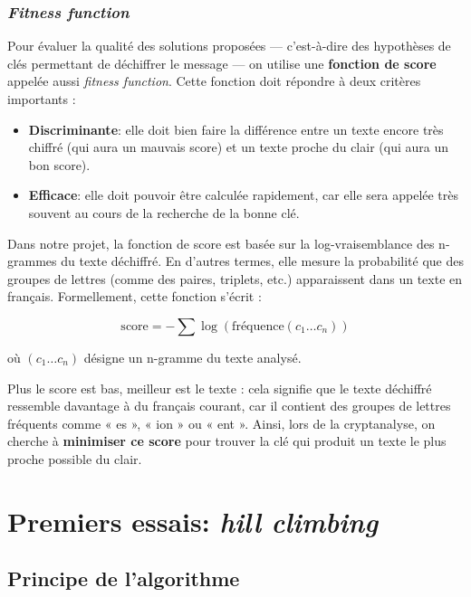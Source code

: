 \documentclass[a4paper]{article}
\begin{document}
\subsubsection{\textit{Fitness function}}

Pour évaluer la qualité des solutions proposées — c’est-à-dire des hypothèses de clés permettant de déchiffrer le message — on utilise une \textbf{fonction de score} appelée aussi \textit{fitness function}. Cette fonction doit répondre à deux critères importants :

\begin{itemize}
    \item \textbf{Discriminante}: elle doit bien faire la différence entre un texte encore très chiffré (qui aura un mauvais score) et un texte proche du clair (qui aura un bon score).
    \item \textbf{Efficace}: elle doit pouvoir être calculée rapidement, car elle sera appelée très souvent au cours de la recherche de la bonne clé.
\end{itemize}

Dans notre projet, la fonction de score est basée sur la log-vraisemblance des n-grammes du texte déchiffré. En d’autres termes, elle mesure la probabilité que des groupes de lettres (comme des paires, triplets, etc.) apparaissent dans un texte en français. Formellement, cette fonction s’écrit :

\[
\text{score} = - \sum \log\left(\text{fréquence}(c_1 \ldots c_n)\right)
\]

où $(c_1 \ldots c_n)$ désigne un n-gramme du texte analysé.

Plus le score est bas, meilleur est le texte : cela signifie que le texte déchiffré ressemble davantage à du français courant, car il contient des groupes de lettres fréquents comme « es », « ion » ou « ent ». Ainsi, lors de la cryptanalyse, on cherche à \textbf{minimiser ce score} pour trouver la clé qui produit un texte le plus proche possible du clair.


\section{Premiers essais: \textit{hill climbing}}

\subsection{Principe de l’algorithme}
\end{document}
